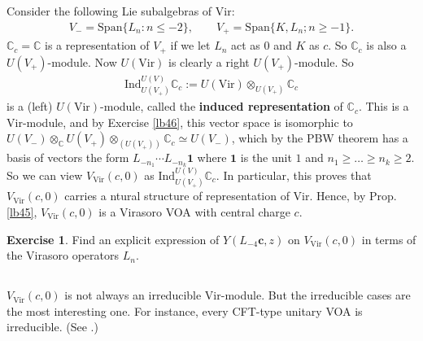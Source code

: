 \documentclass[11pt,b5paper,notitlepage]{article}
\theoremstyle{definition}
\newtheorem{exe}[df]{Exercise}
\theoremstyle{plain}
\newcommand{\id}{\mathbf{1}}
\newcommand{\Vir}{\mathrm{Vir}}
\newcommand{\Span}{\mathrm{Span}}
\newcommand{\Cbb}{\mathbb C}
\newcommand{\cbf}{\mathbf c}
\newcommand{\Ind}{\mathrm{Ind}}
\numberwithin{equation}{section}
\begin{document}
\subsection{}
Consider the following Lie subalgebras of $\Vir$:
\begin{align*}
V_-=\Span\{L_n:n\leq -2\},\qquad V_+=\Span\{K,L_n;n\geq -1\}.	
\end{align*}
$\Cbb_c=\Cbb$ is a representation of $V_+$ if we let $L_n$ act as $0$ and $K$ as $c$. So $\Cbb_c$ is also a $U(V_+)$-module. Now $U(\Vir)$ is clearly a right $U(V_+)$-module. So 
\begin{align*}
\Ind_{U(V_+)}^{U(V)}\Cbb_c:=	 U(\Vir)\otimes_{U(V_+)}\Cbb_c
\end{align*}
is a (left) $U(\Vir)$-module, called the \textbf{induced representation} of $\Cbb_c$. This is a $\Vir$-module, and by Exercise \ref{lb46}, this vector space is isomorphic to $U(V_-)\otimes_\Cbb U(V_+)\otimes_{(U(V_+))}\Cbb_c\simeq U(V_-)$, which by the PBW theorem has a basis of vectors the form $L_{-n_1}\cdots L_{-n_k}\id$ where $\id$ is the unit $1$ and $n_1\geq\dots\geq n_k\geq 2$. So we can view $V_\Vir(c,0)$ as $\Ind_{U(V_+)}^{U(V)}\Cbb_c$. In particular, this proves that $V_\Vir(c,0)$ carries a ntural structure of representation of $\Vir$. Hence, by Prop. \ref{lb45}, $V_\Vir(c,0)$ is a Virasoro VOA with central charge $c$.

\begin{exe}
Find an explicit expression of $Y(L_{-4}\cbf,z)$ on $V_\Vir(c,0)$ in terms of the Virasoro operators $L_n$.
\end{exe}


\subsection{}\label{lb47}


$V_\Vir(c,0)$ is not always an irreducible $\Vir$-module. But the irreducible cases are the most interesting one. For instance, every CFT-type unitary VOA is irreducible. (See \cite{CKLW18}.)
\end{document}
